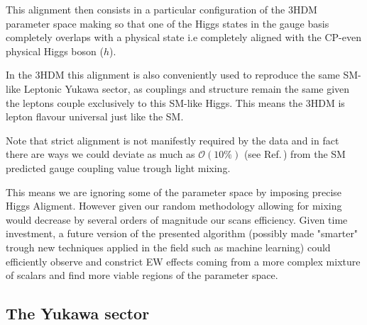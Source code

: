 This alignment then consists in a particular configuration of the 3HDM parameter space making so that one of the Higgs states in the gauge basis completely overlaps with a physical state i.e completely aligned with the CP-even physical Higgs boson ($h$). 

In the 3HDM this alignment is also conveniently used to reproduce the same SM-like Leptonic Yukawa sector, as couplings and structure remain the same given the leptons couple exclusively to this SM-like Higgs. 
%
This means the 3HDM is lepton flavour universal just like the SM. 

Note that strict alignment is not manifestly required by the data and in fact there are ways we could deviate as much as $\mathcal{O}(10\%)$ (see Ref.\,\cite{Aad_2020}) from the SM predicted gauge coupling value trough light mixing. 

This means we are ignoring some of the parameter space by imposing precise Higgs Aligment.
%
However given our random methodology allowing for mixing would decrease by several orders of magnitude our scans efficiency. 
%
Given time investment, a future version of the presented algorithm (possibly made "smarter" trough new techniques applied in the field such as machine learning) could efficiently observe and constrict EW effects coming from a more complex mixture of scalars and find more viable regions of the parameter space.  

\subsection{The Yukawa sector}

